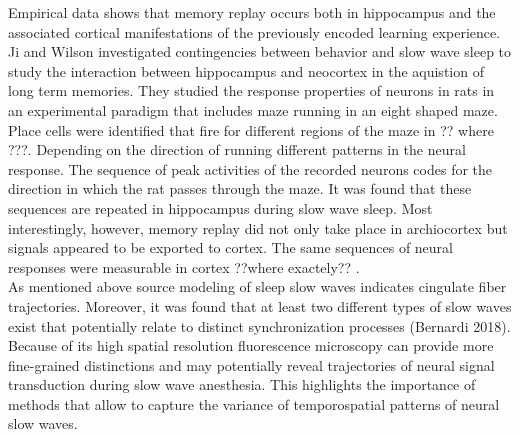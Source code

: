 Empirical data shows that memory replay occurs both in hippocampus and the associated cortical manifestations of the previously encoded learning experience. Ji and Wilson \parencite*{ji2007coordinated} investigated contingencies between behavior and slow wave sleep to study the interaction between hippocampus and neocortex in the aquistion of long term memories. They studied the response properties of neurons in rats in an experimental paradigm that includes maze running in an eight shaped maze. Place cells were identified that fire for different regions of the maze in ?? where ???. Depending on the direction of running different patterns in the neural response. The sequence of peak activities of the recorded neurons codes for the direction in which the rat passes through the maze. It was found that these sequences are repeated in hippocampus during slow wave sleep. Most interestingly, however, memory replay did not only take place in archiocortex but signals appeared to be exported to cortex. The same sequences of neural responses were measurable in cortex ??where exactely?? \parencite{ji2007coordinated}.\\
 As mentioned above source modeling of sleep slow waves indicates cingulate fiber trajectories. Moreover, it was found that at least two different types of slow waves exist that potentially relate to distinct synchronization processes (Bernardi 2018). Because of its high spatial resolution fluorescence microscopy can provide more fine-grained distinctions and may potentially reveal trajectories of neural signal transduction during slow wave anesthesia. This highlights the importance of methods that allow to capture the variance of temporospatial patterns of neural slow waves.



